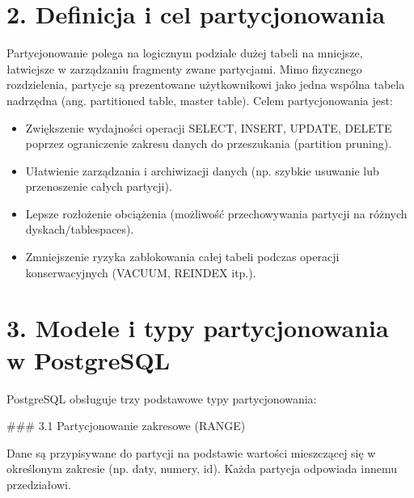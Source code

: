 \documentclass[a4paper,11pt,polish]{sphinxmanual}
\begin{document}
\section{2. Definicja i cel partycjonowania}
\label{\detokenize{rozdzial_1:definicja-i-cel-partycjonowania}}
\sphinxAtStartPar
Partycjonowanie polega na logicznym podziale dużej tabeli na mniejsze, łatwiejsze w zarządzaniu fragmenty zwane partycjami. Mimo fizycznego rozdzielenia, partycje są prezentowane użytkownikowi jako jedna wspólna tabela nadrzędna (ang. partitioned table, master table). Celem partycjonowania jest:
\begin{itemize}
\item {} 
\sphinxAtStartPar
Zwiększenie wydajności operacji SELECT, INSERT, UPDATE, DELETE poprzez ograniczenie zakresu danych do przeszukania (partition pruning).

\item {} 
\sphinxAtStartPar
Ułatwienie zarządzania i archiwizacji danych (np. szybkie usuwanie lub przenoszenie całych partycji).

\item {} 
\sphinxAtStartPar
Lepsze rozłożenie obciążenia (możliwość przechowywania partycji na różnych dyskach/tablespaces).

\item {} 
\sphinxAtStartPar
Zmniejszenie ryzyka zablokowania całej tabeli podczas operacji konserwacyjnych (VACUUM, REINDEX itp.).

\end{itemize}


\section{3. Modele i typy partycjonowania w PostgreSQL}
\label{\detokenize{rozdzial_1:modele-i-typy-partycjonowania-w-postgresql}}
\sphinxAtStartPar
PostgreSQL obsługuje trzy podstawowe typy partycjonowania:

\sphinxAtStartPar
\#\#\# 3.1 Partycjonowanie zakresowe (RANGE)

\sphinxAtStartPar
Dane są przypisywane do partycji na podstawie wartości mieszczącej się w określonym zakresie (np. daty, numery, id). Każda partycja odpowiada innemu przedziałowi.

\sphinxAtStartPar
{}
\end{document}
